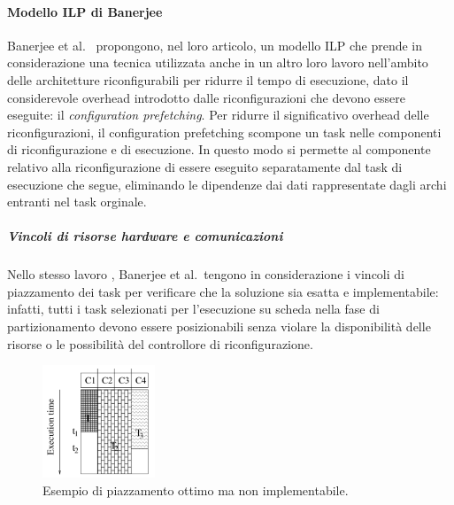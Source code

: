 \paragraph{Modello \acs{ILP} di Banerjee}
\label{par:BanerjeeILP}
Banerjee et al.~\cite{BanerjeePhysicalConstraints} propongono, nel loro 
articolo, un modello \ac{ILP} che prende in considerazione una 
tecnica utilizzata anche in un altro loro lavoro 
\cite{BanerjeeReconfigurationOverhead}nell'ambito delle architetture 
riconfigurabili per ridurre il tempo di esecuzione, dato il considerevole 
overhead introdotto dalle riconfigurazioni che devono essere eseguite: il 
\emph{configuration prefetching}. Per ridurre il significativo overhead delle 
riconfigurazioni, il configuration prefetching scompone un task nelle componenti 
di riconfigurazione e di esecuzione. In questo modo si permette al componente 
relativo alla riconfigurazione di essere eseguito separatamente dal task di 
esecuzione che segue, eliminando le dipendenze dai dati rappresentate dagli 
archi entranti nel task orginale.

\subparagraph{Vincoli di risorse hardware e comunicazioni}
Nello stesso lavoro \cite{BanerjeePhysicalConstraints}, Banerjee et al.~tengono 
in considerazione i vincoli di piazzamento dei task per verificare che la 
soluzione sia esatta e implementabile: infatti, tutti i task selezionati per 
l'esecuzione su scheda nella fase di partizionamento devono essere 
posizionabili senza violare la disponibilità delle risorse o le possibilità del 
controllore di riconfigurazione.

\begin{figure}[!htb]
 \begin{center}
  \includegraphics[width=0.3\textwidth]
{./capitoli/figure/cap2/InfeasiblePlacement.pdf}
\caption[Piazzamento ottimo non implementabile]{Esempio di piazzamento ottimo 
ma non implementabile\footnotemark.}
\label{fig:infeasiblePlacement}
 \end{center}
\end{figure}


